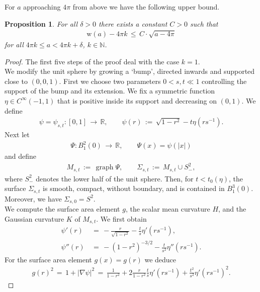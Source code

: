 \documentclass[reqno,makeidx,12pt]{amsart}
\theoremstyle{note}
\newtheorem{proposition}{Proposition}
\theoremstyle{definition}
\begin{document}
For $a$ approaching $4\pi $ from above we have the following upper bound.
\begin{proposition}\label{prop:A-above}
For all $\delta>0$ there exists a constant $C>0$ such that
\begin{gather}\label{eq:est-A-above}
  {\text{w}}(a) - 4 \pi k\,\leq\, C\cdot \sqrt{a-4\pi }
\end{gather}
for all $4\pi k\leq a< 4\pi k+\delta$, $k\in{\ensuremath{\mathbb{N}}}$.
\end{proposition}
\begin{proof}
The first five steps of the proof deal with the case $k=1$.
{\mbox{}\\\underline{}}
We modify the unit sphere by growing a `bump', directed inwards and
supported close to $(0,0,1)$. First we choose two parameters $0<s,t\ll 1$
controlling the support of the bump and its extension. We fix
a symmetric function $\eta\in C^\infty(-1,1)$ that is positive inside
its support and  decreasing on $(0,1)$. We define
\begin{gather*}
  \psi=\psi_{s,t}: [0,1]\,\to\,{\mathbb R},\qquad \psi(r)\,:=\, \sqrt{1-r^2}
  -t\eta(rs^{-1}). 
\end{gather*}
Next let
\begin{gather*}
  \Psi: B^2_1(0)\,\to\, {\mathbb R},\qquad \Psi(x)=\psi(|x|)
\end{gather*}
and define
\begin{gather*}
  M_{s,t}\,:=\, \operatorname{graph} \Psi,\qquad \Sigma_{s,t}\,:=\, M_{s,t}\cup S^2_-,
\end{gather*}
where $S^2_-$ denotes the lower half of the unit sphere.
Then, for $t<t_0(\eta)$, the surface $\Sigma_{s,t}$ 
is smooth, compact, without boundary,
and is contained in $B_1^3(0)$. Moreover, we have $\Sigma_{s,0}=
S^2$.
{\mbox{}\\\underline{}}
We compute the surface area element $g$, the scalar mean curvature $H$, and the
Gaussian curvature $K$ of $M_{s,t}$. We first obtain
\begin{align}
  \psi'(r)\,&=\, -\frac{r}{\sqrt{1-r^2}} -
  \frac{t}{s}\eta'(rs^{-1}),\\
  \psi''(r) \,&=\, -(1-r^2)^{-3/2} -\frac{t}{s^2}\eta''(rs^{-1}).
\end{align}
For the surface area element $g(x)=g(r)$ we deduce
\begin{gather}
  g(r)^2\,=\, 1+ |\nabla \psi|^2\,=\, \frac{1}{1-r^2} +
  2\frac{r}{1-r^2}\frac{t}{s}\eta'(rs^{-1})
  +\frac{t^2}{s^2}\eta'(rs^{-1})^2. \label{eq:comp-g}

\end{gather}
\end{proof}
\end{document}
